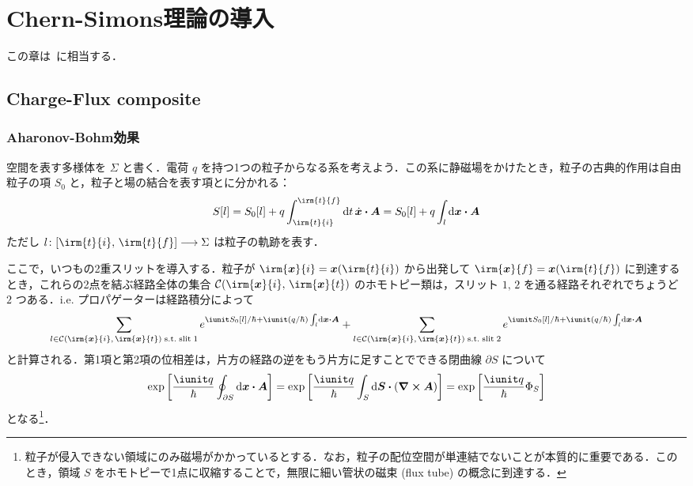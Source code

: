 \documentclass[TQFT_main]{subfiles}
\begin{document}
\setcounter{chapter}{1}

\chapter{Chern-Simons理論の導入}

この章は~\cite[Chapter4, 5]{Simon2021}に相当する．

\section{Charge-Flux composite}

\subsection{Aharonov-Bohm効果}

空間を表す多様体を $\Sigma$ と書く．電荷 $q$ を持つ1つの粒子からなる系を考えよう．この系に静磁場をかけたとき，粒子の古典的作用は自由粒子の項 $S_0$ と，粒子と場の結合を表す項とに分かれる：
\begin{align}
    S[l] = S_0[l] + q \int_{\irm{t}{i}}^{\irm{t}{f}} \dd{t} \dot{\bm{x}} \vdot \bm{A} = S_0[l] + q \int_l \dd{\bm{x}} \vdot \bm{A}
\end{align}
ただし $l \colon [\irm{t}{i},\, \irm{t}{f}] \lto \Sigma$ は粒子の軌跡を表す．

ここで，いつもの2重スリットを導入する．粒子が $\irm{\bm{x}}{i} = \bm{x}(\irm{t}{i})$ から出発して $\irm{\bm{x}}{f} = \bm{x}(\irm{t}{f})$ に到達するとき，これらの2点を結ぶ経路全体の集合 $\mathcal{C}(\irm{\bm{x}}{i},\, \irm{\bm{x}}{t})$ のホモトピー類は，スリット $1,\, 2$ を通る経路それぞれでちょうど $2$ つある．i.e.
プロパゲーターは経路積分によって
\begin{align}
    \sum_{l \in \mathcal{C}(\irm{\bm{x}}{i},\, \irm{\bm{x}}{t})\; \mathrm{s.t.}\;\mathrm{slit}\; 1} e^{\iunit S_0 [l] / \hbar + \iunit (q / \hbar) \int_l \dd{\bm{x}} \vdot \bm{A}} + \sum_{l \in \mathcal{C}(\irm{\bm{x}}{i},\, \irm{\bm{x}}{t})\; \mathrm{s.t.}\;\mathrm{slit}\; 2} e^{\iunit S_0 [l] / \hbar + \iunit (q / \hbar) \int_l \dd{\bm{x}} \vdot \bm{A}}
\end{align}
と計算される．第1項と第2項の位相差は，片方の経路の逆をもう片方に足すことでできる閉曲線 $\partial S$ について
\begin{align}
    \exp \left[ \frac{\iunit q}{\hbar} \oint_{\partial S} \dd{\bm{x}} \vdot \bm{A} \right] = \exp \left[ \frac{\iunit q}{\hbar} \int_S \dd{\bm{S}} \vdot (\curl{\bm{A}}) \right] = \exp \left[ \frac{\iunit q}{\hbar} \Phi_{S}\right] 
\end{align}
となる\footnote{粒子が侵入できない領域にのみ磁場がかかっているとする．なお，粒子の配位空間が単連結でないことが本質的に重要である．このとき，領域 $S$ をホモトピーで1点に収縮することで，無限に細い管状の磁束 (flux tube) の概念に到達する．}．
\end{document}
